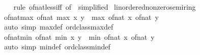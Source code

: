 \begin{isabellebody}
%
\isadelimproof
\ \ %
\endisadelimproof
%
\isatagproof
{}\isamarkupfalse%
\ {\isacharparenleft}{\kern0pt}rule\ of{\isacharunderscore}{\kern0pt}nat{\isacharunderscore}{\kern0pt}less{\isacharunderscore}{\kern0pt}iff\ {\isacharbrackleft}{\kern0pt}of\ {}{\isacharcomma}{\kern0pt}\ simplified{\isacharbrackright}{\kern0pt}{\isacharparenright}{\kern0pt}%
\endisatagproof
{\isafoldproof}%
%
\isadelimproof
\isanewline
%
\endisadelimproof
\isanewline
{}\isamarkupfalse%
\isanewline
\isanewline
{}\isamarkupfalse%
\ linordered{\isacharunderscore}{\kern0pt}nonzero{\isacharunderscore}{\kern0pt}semiring\isanewline
{}\isanewline
\isanewline
{}\isamarkupfalse%
\ of{\isacharunderscore}{\kern0pt}nat{\isacharunderscore}{\kern0pt}max{\isacharcolon}{\kern0pt}\ {\isachardoublequoteopen}of{\isacharunderscore}{\kern0pt}nat\ {\isacharparenleft}{\kern0pt}max\ x\ y{\isacharparenright}{\kern0pt}\ {\isacharequal}{\kern0pt}\ max\ {\isacharparenleft}{\kern0pt}of{\isacharunderscore}{\kern0pt}nat\ x{\isacharparenright}{\kern0pt}\ {\isacharparenleft}{\kern0pt}of{\isacharunderscore}{\kern0pt}nat\ y{\isacharparenright}{\kern0pt}{\isachardoublequoteclose}\isanewline
%
\isadelimproof
\ \ %
\endisadelimproof
%
\isatagproof
{}\isamarkupfalse%
\ {\isacharparenleft}{\kern0pt}auto\ simp{\isacharcolon}{\kern0pt}\ max{\isacharunderscore}{\kern0pt}def\ ord{\isacharunderscore}{\kern0pt}class{\isachardot}{\kern0pt}max{\isacharunderscore}{\kern0pt}def{\isacharparenright}{\kern0pt}%
\endisatagproof
{\isafoldproof}%
%
\isadelimproof
\isanewline
%
\endisadelimproof
\isanewline
{}\isamarkupfalse%
\ of{\isacharunderscore}{\kern0pt}nat{\isacharunderscore}{\kern0pt}min{\isacharcolon}{\kern0pt}\ {\isachardoublequoteopen}of{\isacharunderscore}{\kern0pt}nat\ {\isacharparenleft}{\kern0pt}min\ x\ y{\isacharparenright}{\kern0pt}\ {\isacharequal}{\kern0pt}\ min\ {\isacharparenleft}{\kern0pt}of{\isacharunderscore}{\kern0pt}nat\ x{\isacharparenright}{\kern0pt}\ {\isacharparenleft}{\kern0pt}of{\isacharunderscore}{\kern0pt}nat\ y{\isacharparenright}{\kern0pt}{\isachardoublequoteclose}\isanewline
%
\isadelimproof
\ \ %
\endisadelimproof
%
\isatagproof
{}\isamarkupfalse%
\ {\isacharparenleft}{\kern0pt}auto\ simp{\isacharcolon}{\kern0pt}\ min{\isacharunderscore}{\kern0pt}def\ ord{\isacharunderscore}{\kern0pt}class{\isachardot}{\kern0pt}min{\isacharunderscore}{\kern0pt}def{\isacharparenright}{\kern0pt}%
\endisatagproof
{\isafoldproof}%
%
\isadelimproof
\isanewline
%
\endisadelimproof
\isanewline
{}\isamarkupfalse%

\end{isabellebody}
